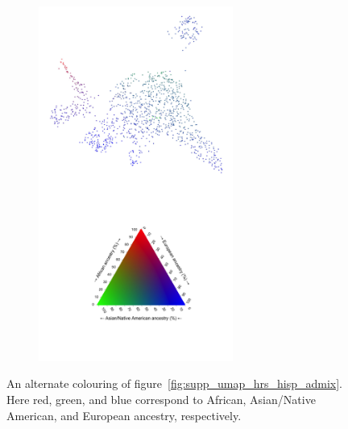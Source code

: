 \documentclass[12pt]{pnas-new}
\begin{document}
\begin{figure}
    \centering
    \begin{subfigure}{\textwidth}
    \includegraphics[width=0.7\textwidth]{images/HRS_1000G_NP1_UMAP_PC7_NC2_NN15_MD05_pca_hrshisp_added1kgp_2018115153245_admix132_hisp.jpeg}
    \end{subfigure}
    \caption{An alternate colouring of figure~\ref{fig:supp_umap_hrs_hisp_admix}. Here red, green, and blue correspond to African, Asian/Native American, and European ancestry, respectively.}
    \label{fig:supp_umap_hrs_hisp_admix_alt}
\end{figure}
\end{document}
